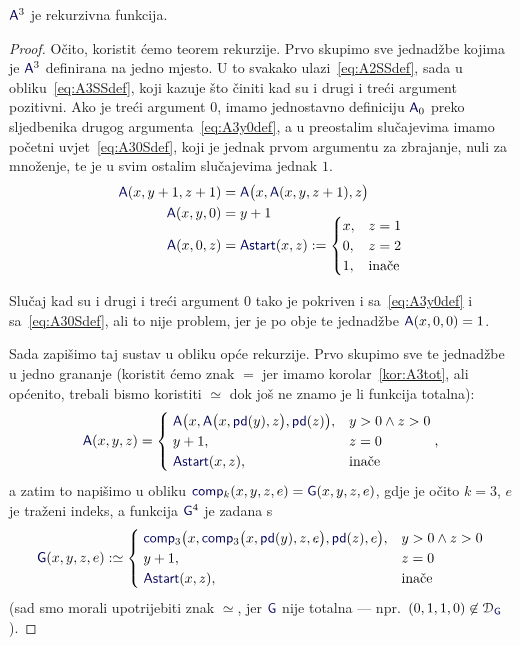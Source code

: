 \begin{propozicija}
    $\f A^3$ je rekurzivna funkcija.
\end{propozicija}
\begin{proof}
Očito, koristit ćemo teorem rekurzije. Prvo skupimo sve jednadžbe kojima je $\f A^3$ definirana na jedno mjesto. U to svakako ulazi~\eqref{eq:A2SSdef}, sada u obliku~\eqref{eq:A3SSdef}, koji kazuje što činiti kad su i drugi i treći argument pozitivni. Ako je treći argument $0$, imamo jednostavno definiciju $\f A_0$ preko sljedbenika drugog argumenta~\eqref{eq:A3y0def}, a u preostalim slučajevima imamo početni uvjet~\eqref{eq:A30Sdef}, koji je jednak prvom argumentu za zbrajanje, nuli za množenje, te je u svim ostalim slučajevima jednak $1$.
\begin{align}
\label{eq:A3SSdef}
    \f A(x,y+1,z+1)&=\f A\bigl(x,\f A(x,y,z+1),z\bigr)\\
\label{eq:A3y0def}
    \f A(x,y,0)&=y+1\\[-3mm]
\label{eq:A30Sdef}
    \f A(x,0,z)&=\f{Astart}(x,z):=\begin{cases}
        x,&z=1\\
        0,&z=2\\
        1,&\text{inače}
    \end{cases}
\end{align}

Slučaj kad su i drugi i treći argument $0$ tako je pokriven i sa~\eqref{eq:A3y0def} i sa~\eqref{eq:A30Sdef}, ali to nije problem, jer je po obje te jednadžbe $\f A(x,0,0)=1$.

Sada zapišimo taj sustav u obliku opće rekurzije. Prvo skupimo sve te jednadžbe u jedno grananje (koristit ćemo znak $=$ jer imamo korolar~\ref{kor:A3tot}, ali općenito, trebali bismo koristiti $\simeq$ dok još ne znamo je li funkcija totalna):
\begin{equation}
    \f A(x,y,z)=\begin{cases}
        \;\f A\bigl(x,\f A\bigl(x,\f{pd}(y),z\bigr),\f{pd}(z)\bigr),&y>0\land z>0\\
        \;y+1,&z=0\\
        \;\f{Astart}(x,z),&\text{inače}
    \end{cases}\text,
\end{equation}
a zatim to napišimo u obliku $\f{comp}_k(x,y,z,e)=\f G(x,y,z,e)$, gdje je očito $k=3$, $e$ je traženi indeks, a funkcija $\f G^4$ je zadana s
\begin{equation}
    \f G(x,y,z,e):\simeq\begin{cases}
        \;\f{comp}_3\bigl(x,\f{comp}_3\bigl(x,\f{pd}(y),z,e\bigr),\f{pd}(z),e\bigr),&y>0\land z>0\\
        \;y+1,&z=0\\
        \;\f{Astart}(x,z),&\text{inače}
    \end{cases}
\end{equation}
(sad smo morali upotrijebiti znak $\simeq$, jer $\f G$ nije totalna --- npr.\ $(0,1,1,0)\not\in\dom{\f G}$).


\end{proof}
